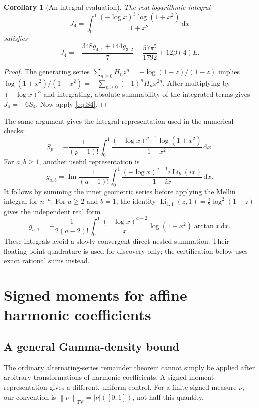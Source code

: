 \documentclass[11pt,letterpaper]{article}
\numberwithin{equation}{section}
\newtheorem{corollary}[theorem]{Corollary}
\theoremstyle{definition}
\DeclareMathOperator{\Li}{Li}
\DeclareMathOperator{\Imag}{Im}
\DeclareMathOperator{\TV}{TV}
\newcommand{\dd}{\,\mathrm d}
\newcommand{\norm}[1]{\left\lVert#1\right\rVert}
\begin{document}
\begin{corollary}[An integral evaluation]\label{cor:integral}
The real logarithmic integral
\begin{equation}
 J_4=\int_0^1\frac{(-\log x)^3\log(1+x^2)}{1+x^2}\dd x
 \label{eq:J4}
\end{equation}
satisfies
\begin{equation}
 J_4=-\frac{348g_{4,1}+144g_{3,2}}7
       -\frac{57\pi^5}{1792}+12\beta(4)L.
 \label{eq:J4value}
\end{equation}
\end{corollary}
\begin{proof}
The generating series
$\sum_{n\ge0}H_nz^n=-\log(1-z)/(1-z)$ implies
$\log(1+x^2)/(1+x^2)=-\sum_{n\ge0}(-1)^nH_nx^{2n}$.
After multiplying by $(-\log x)^3$ and integrating, absolute
summability of the integrated terms gives $J_4=-6S_4$.
Now apply \eqref{eq:S4}.
\end{proof}

The same argument gives the integral representation used in the numerical
checks:
\begin{equation}
 S_p=-\frac1{(p-1)!}\int_0^1
       \frac{(-\log x)^{p-1}\log(1+x^2)}{1+x^2}\dd x.
 \label{eq:Spintegral}
\end{equation}
For $a,b\ge1$, another useful representation is
\begin{equation}
 g_{a,b}=\Imag\frac1{(a-1)!}\int_0^1
       \frac{(-\log x)^{a-1}i\Li_b(ix)}{1-ix}\dd x.
 \label{eq:gintegral}
\end{equation}
It follows by summing the inner geometric series before applying the
Mellin integral for $n^{-a}$. For $a\ge2$ and $b=1$, the identity
$\Li_{1,1}(z,1)=\tfrac12\log^2(1-z)$ gives the independent real form
\begin{equation}
 g_{a,1}=-\frac1{2(a-2)!}\int_0^1
  \frac{(-\log x)^{a-2}}x\log(1+x^2)\arctan x\dd x.
 \label{eq:g1integral}
\end{equation}
These integrals avoid a slowly convergent direct nested summation.
Their floating-point quadrature is used for discovery only; the
certification below uses exact rational sums instead.

\section{Signed moments for affine harmonic coefficients}
\label{sec:moments}

\subsection{A general Gamma-density bound}
The ordinary alternating-series remainder theorem cannot simply be
applied after arbitrary transformations of harmonic coefficients.
A signed-moment representation gives a different, uniform control.
For a finite signed measure $\nu$, our convention is
$\norm\nu_{\TV}=|\nu|([0,1])$, not half this quantity.
\end{document}
